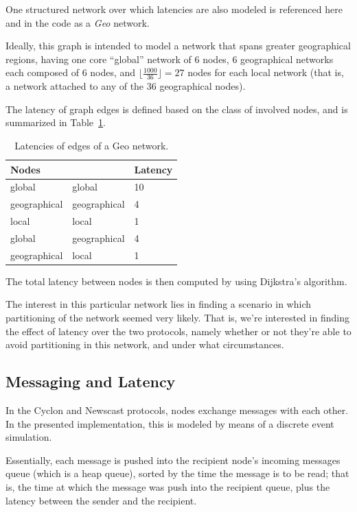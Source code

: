 \documentclass[a4paper]{ifacconf}
\begin{document}
One structured network over which latencies are also modeled is referenced here and in the code as a \emph{Geo} network.

Ideally, this graph is intended to model a network that spans greater geographical regions, having one core ``global'' network of 6 nodes, 6 geographical networks each composed of 6 nodes, and $\lfloor\frac{1000}{36}\rfloor = 27$ nodes for each local network (that is, a network attached to any of the 36 geographical nodes).

The latency of graph edges is defined based on the class of involved nodes, and is summarized in Table~\ref{tab:latency}.

\begin{table}
    \centering\begin{tabular}{lll}
        Nodes & & Latency \\
        \hline
        global & global & 10 \\
        geographical & geographical & 4 \\
        local & local & 1 \\
        global & geographical & 4 \\
        geographical & local & 1 \\
    \end{tabular}
    \caption{Latencies of edges of a Geo network.}
    \label{tab:latency}
\end{table}

The total latency between nodes is then computed by using Dijkstra's algorithm.

The interest in this particular network lies in finding a scenario in which partitioning of the network seemed very likely.
That is, we're interested in finding the effect of latency over the two protocols, namely whether or not they're able to avoid partitioning in this network, and under what circumstances.

\subsection{Messaging and Latency}\label{sec:messaging}

In the Cyclon and Newscast protocols, nodes exchange messages with each other.
In the presented implementation, this is modeled by means of a discrete event simulation.

Essentially, each message is pushed into the recipient node's incoming messages queue (which is a heap queue), sorted by the time the message is to be read; that is, the time at which the message was push into the recipient queue, plus the latency between the sender and the recipient.
\end{document}
